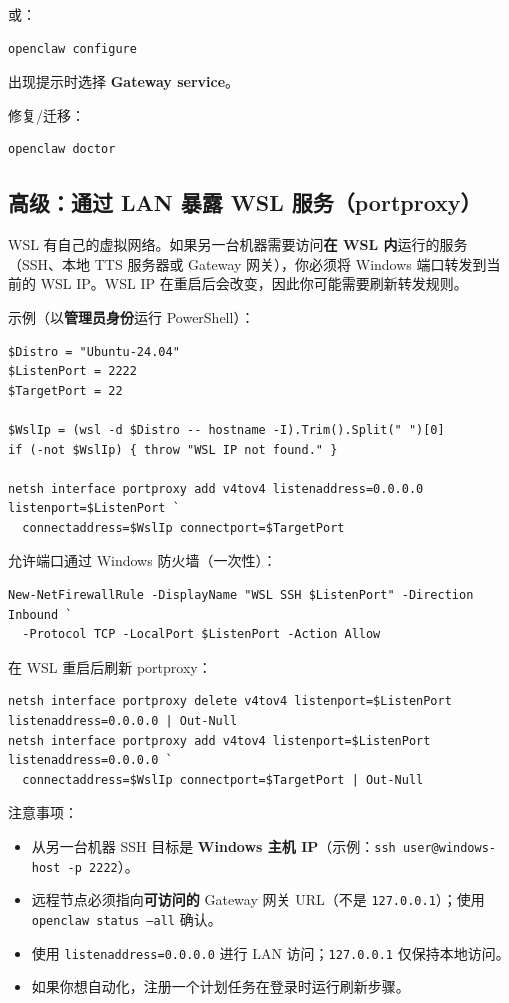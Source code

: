或：

\begin{lstlisting}
openclaw configure
\end{lstlisting}


出现提示时选择 \textbf{Gateway service}。

修复/迁移：

\begin{lstlisting}
openclaw doctor
\end{lstlisting}


\subsection{高级：通过 LAN 暴露 WSL 服务（portproxy）}


WSL 有自己的虚拟网络。如果另一台机器需要访问\textbf{在 WSL 内}运行的服务（SSH、本地 TTS 服务器或 Gateway 网关），你必须将 Windows 端口转发到当前的 WSL IP。WSL IP 在重启后会改变，因此你可能需要刷新转发规则。

示例（以\textbf{管理员身份}运行 PowerShell）：

\begin{lstlisting}
$Distro = "Ubuntu-24.04"
$ListenPort = 2222
$TargetPort = 22

$WslIp = (wsl -d $Distro -- hostname -I).Trim().Split(" ")[0]
if (-not $WslIp) { throw "WSL IP not found." }

netsh interface portproxy add v4tov4 listenaddress=0.0.0.0 listenport=$ListenPort `
  connectaddress=$WslIp connectport=$TargetPort
\end{lstlisting}


允许端口通过 Windows 防火墙（一次性）：

\begin{lstlisting}
New-NetFirewallRule -DisplayName "WSL SSH $ListenPort" -Direction Inbound `
  -Protocol TCP -LocalPort $ListenPort -Action Allow
\end{lstlisting}


在 WSL 重启后刷新 portproxy：

\begin{lstlisting}
netsh interface portproxy delete v4tov4 listenport=$ListenPort listenaddress=0.0.0.0 | Out-Null
netsh interface portproxy add v4tov4 listenport=$ListenPort listenaddress=0.0.0.0 `
  connectaddress=$WslIp connectport=$TargetPort | Out-Null
\end{lstlisting}


注意事项：

\begin{itemize}
  \item 从另一台机器 SSH 目标是 \textbf{Windows 主机 IP}（示例：\texttt{ssh user@windows-host -p 2222}）。
  \item 远程节点必须指向\textbf{可访问的} Gateway 网关 URL（不是 \texttt{127.0.0.1}）；使用 \texttt{openclaw status --all} 确认。
  \item 使用 \texttt{listenaddress=0.0.0.0} 进行 LAN 访问；\texttt{127.0.0.1} 仅保持本地访问。
  \item 如果你想自动化，注册一个计划任务在登录时运行刷新步骤。
\end{itemize}


